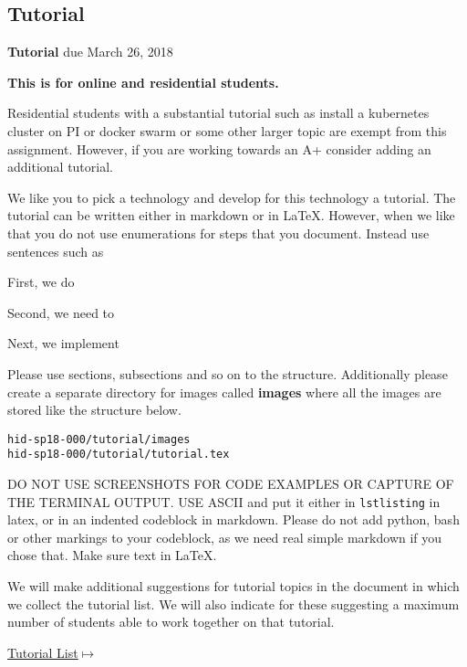 \subsection{Tutorial}
\label{E:616-tutorial}

\begin{exercise} {\bf Tutorial} due March 26, 2018

{\bf This is for online and residential students.}

Residential students with a substantial tutorial such as install a
kubernetes cluster on PI or docker swarm or some other larger topic
are exempt from this assignment. However, if you are working towards
an A+ consider adding an additional tutorial.

 
We like you to pick a technology and develop for this technology a
tutorial. The tutorial can be written either in markdown or in
LaTeX. However, when we like that you do not use enumerations for
steps that you document. Instead use sentences such as
 
First, we do 
 
Second, we need to
 
Next, we implement
 
Please use sections, subsections and so on to the
structure. Additionally please create a separate directory for images
called {\bf images} where all the images are stored like the structure
below. 

\begin{lstlisting}
hid-sp18-000/tutorial/images
hid-sp18-000/tutorial/tutorial.tex
\end{lstlisting}
 
DO NOT USE SCREENSHOTS FOR CODE EXAMPLES OR CAPTURE OF THE TERMINAL
OUTPUT.  USE ASCII and put it either in \verb|lstlisting| in latex, or in an
indented codeblock in markdown. Please do not add python, bash or
other markings to your codeblock, as we need real simple markdown if
you chose that. Make sure text in LaTeX.

 
We will make additional suggestions for tutorial topics in the
document in which we collect the tutorial list. We will also indicate
for these suggesting a maximum number of students able to work
together on that tutorial.

{\hfill
  \href{https://docs.google.com/document/d/1L2-wYc7S7hb5u6ZNtKpTvlXqKMkqq-B38hlaBCw-eww/edit?usp=sharing}{Tutorial
    List$\mapsto$}}



\end{exercise} 

